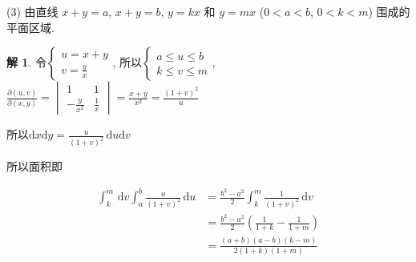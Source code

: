 \documentclass[a4paper,12pt]{article}
\theoremstyle{definition}
\newtheorem*{sol}{解}
\begin{document}
(3) 由直线 $x + y = a$, $x + y = b$, $y = kx$ 和 $y = mx$ ($0 < a < b$, $0 < k < m$) 围成的平面区域.
\begin{sol}
    令$\begin{cases}
            u=x+y \\
            v=\frac{y}{x}
        \end{cases}$, 所以$\begin{cases}
            a\leq u\leq b \\
            k\leq v\leq m
        \end{cases}$, $\frac{\partial(u,v)}{\partial(x,y)}=\begin{vmatrix}
            1              & 1           \\
            -\frac{y}{x^2} & \frac{1}{x}
        \end{vmatrix}=\frac{x+y}{x^2}=\frac{(1+v)^2}{u}$

    所以$\mathrm{d}x\mathrm{d}y=\frac{u}{(1+v)^2}\,\mathrm{d}u\mathrm{d}v$

    所以面积即

    \begin{align*}
        \int_k^m\,\mathrm{d}v\int_a^b\frac{u}{(1+v)^2}\,\mathrm{d}u
         & =\frac{b^2-a^2}{2}\int_k^m\frac{1}{(1+v)^2}\,\mathrm{d}v \\
         & =\frac{b^2-a^2}{2}(\frac{1}{1+k}-\frac{1}{1+m})          \\
         & =\frac{(a+b)(a-b)(k-m)}{2(1+k)(1+m)}
    \end{align*}
\end{sol}
\end{document}
